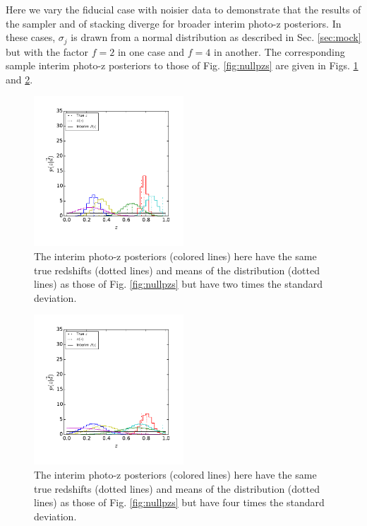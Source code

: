 \documentclass[preprint]{aastex}
\begin{document}
Here we vary the fiducial case with noisier data to demonstrate that the 
results of the sampler and of stacking diverge for broader interim photo-z 
posteriors.  In these cases, $\sigma_{j}$ is drawn from a normal distribution 
as described in Sec. \ref{sec:mock} but with the factor $f=2$ in one case and 
$f=4$ in another.  The corresponding sample interim photo-z posteriors to those 
of Fig. \ref{fig:nullpzs} are given in Figs. \ref{fig:sig2pzs} and 
\ref{fig:sig4pzs}.  

\begin{figure}
\includegraphics[width=0.5\textwidth]{figs/sig2/samplepzs.pdf}
\caption{The interim photo-z posteriors (colored lines) here have the same true 
redshifts (dotted lines) and means of the distribution (dotted lines) as those 
of Fig. \ref{fig:nullpzs} but have two times the standard deviation.}
\label{fig:sig2pzs}
\end{figure}

\begin{figure}
\includegraphics[width=0.5\textwidth]{figs/sig4/samplepzs.pdf}
\caption{The interim photo-z posteriors (colored lines) here have the same true 
redshifts (dotted lines) and means of the distribution (dotted lines) as those 
of Fig. \ref{fig:nullpzs} but have four times the standard deviation.}
\label{fig:sig4pzs}
\end{figure}
\end{document}
